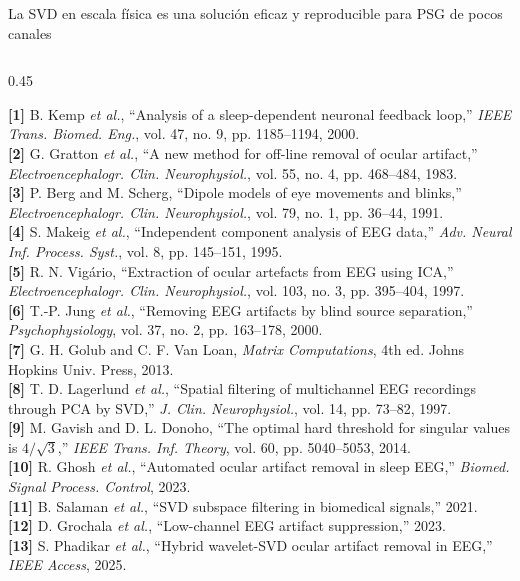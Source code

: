 \documentclass[aspectratio=169,9pt]{beamer}
\begin{document}
\begin{frame}{La SVD en escala f\'isica es una soluci\'on eficaz y reproducible para PSG de pocos canales}
\begin{columns}[T,onlytextwidth]
    \begin{column}{0.45\textwidth}
      \begin{tcolorbox}[basecard, title={\scriptsize\bfseries Referencias Bibliogr\'aficas (Formato IEEE)}, colbacktitle=UDNavy, coltitle=white, top=3pt, bottom=3pt]
        \fontsize{5.1pt}{6.0pt}\selectfont\raggedright
        \textbf{[1]} B. Kemp \textit{et al.}, ``Analysis of a sleep-dependent neuronal feedback loop,'' \textit{IEEE Trans. Biomed. Eng.}, vol. 47, no. 9, pp. 1185--1194, 2000.\\[1.2pt]
        \textbf{[2]} G. Gratton \textit{et al.}, ``A new method for off-line removal of ocular artifact,'' \textit{Electroencephalogr. Clin. Neurophysiol.}, vol. 55, no. 4, pp. 468--484, 1983.\\[1.2pt]
        \textbf{[3]} P. Berg and M. Scherg, ``Dipole models of eye movements and blinks,'' \textit{Electroencephalogr. Clin. Neurophysiol.}, vol. 79, no. 1, pp. 36--44, 1991.\\[1.2pt]
        \textbf{[4]} S. Makeig \textit{et al.}, ``Independent component analysis of EEG data,'' \textit{Adv. Neural Inf. Process. Syst.}, vol. 8, pp. 145--151, 1995.\\[1.2pt]
        \textbf{[5]} R. N. Vig\'ario, ``Extraction of ocular artefacts from EEG using ICA,'' \textit{Electroencephalogr. Clin. Neurophysiol.}, vol. 103, no. 3, pp. 395--404, 1997.\\[1.2pt]
        \textbf{[6]} T.-P. Jung \textit{et al.}, ``Removing EEG artifacts by blind source separation,'' \textit{Psychophysiology}, vol. 37, no. 2, pp. 163--178, 2000.\\[1.2pt]
        \textbf{[7]} G. H. Golub and C. F. Van Loan, \textit{Matrix Computations}, 4th ed. Johns Hopkins Univ. Press, 2013.\\[1.2pt]
        \textbf{[8]} T. D. Lagerlund \textit{et al.}, ``Spatial filtering of multichannel EEG recordings through PCA by SVD,'' \textit{J. Clin. Neurophysiol.}, vol. 14, pp. 73--82, 1997.\\[1.2pt]
        \textbf{[9]} M. Gavish and D. L. Donoho, ``The optimal hard threshold for singular values is $4/\sqrt{3}$,'' \textit{IEEE Trans. Inf. Theory}, vol. 60, pp. 5040--5053, 2014.\\[1.2pt]
        \textbf{[10]} R. Ghosh \textit{et al.}, ``Automated ocular artifact removal in sleep EEG,'' \textit{Biomed. Signal Process. Control}, 2023.\\[1.2pt]
        \textbf{[11]} B. Salaman \textit{et al.}, ``SVD subspace filtering in biomedical signals,'' 2021.\\[1.2pt]
        \textbf{[12]} D. Grochala \textit{et al.}, ``Low-channel EEG artifact suppression,'' 2023.\\[1.2pt]
        \textbf{[13]} S. Phadikar \textit{et al.}, ``Hybrid wavelet-SVD ocular artifact removal in EEG,'' \textit{IEEE Access}, 2025.
      \end{tcolorbox}
    \end{column}
  \end{columns}
\end{frame}
\end{document}
